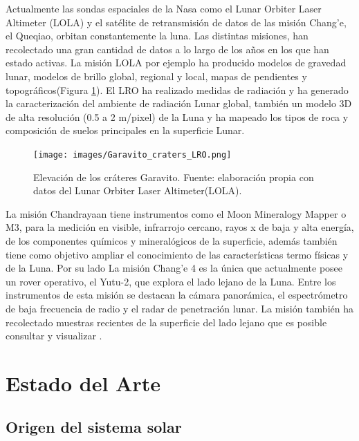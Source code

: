\documentclass[12pt]{article}
\begin{document}
Actualmente las sondas espaciales de la Nasa como el Lunar Orbiter Laser Altimeter (LOLA) y 
el satélite de retransmisión 
de datos de las misión Chang'e, el Queqiao, orbitan constantemente la luna.
Las distintas misiones, han recolectado una gran cantidad de datos a lo largo de los años en los que han 
estado activas. La misión LOLA por ejemplo ha producido modelos de gravedad lunar, modelos de brillo global, 
regional y local, mapas de pendientes y topográficos(Figura \ref{fig:elevacion_luna}). El LRO ha 
realizado medidas de radiación y ha generado la caracterización del ambiente de radiación Lunar global, 
también un modelo 3D de alta resolución (0.5 a 2 m/pixel) de la Luna y ha mapeado los tipos de roca 
y composición de suelos principales en la superficie Lunar. 
\begin{figure}[H]
    \texttt{[image: images/Garavito\_craters\_LRO.png]}
    \centering
    \caption{Elevación de los cráteres Garavito.
    Fuente: elaboración propia con datos del Lunar Orbiter Laser Altimeter(LOLA).}
    \label{fig:elevacion_luna}
\end{figure}
La misión Chandrayaan tiene instrumentos como el Moon Mineralogy Mapper o M3, para la medición en 
visible, infrarrojo cercano, rayos x de baja y alta energía, de los componentes químicos y mineralógicos de 
la superficie, además también tiene como objetivo ampliar el conocimiento de las características termo físicas 
y de la Luna. Por su lado La misión Chang'e 4 es la única que actualmente posee un rover operativo, 
el Yutu-2, que explora el lado lejano de la Luna. Entre los instrumentos de esta misión se destacan la 
cámara panorámica, el espectrómetro de baja frecuencia de radio y el radar de penetración lunar. 
La misión también ha recolectado muestras recientes  de la superficie del lado lejano que es posible 
consultar y visualizar 
\parencite{ZHAO2023115766}.

\section{Estado del Arte}\label{sec:estado_del_arte}

\subsection{Origen del sistema solar}\label{sec:origen_solar}
\end{document}

